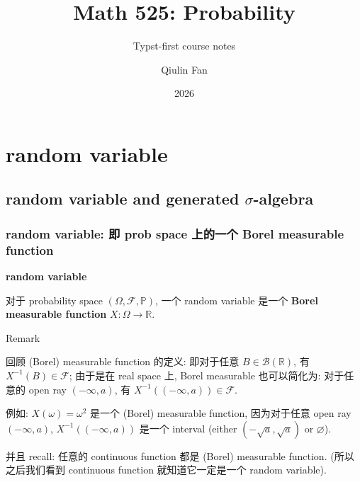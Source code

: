\documentclass{qlnotes-export}
\title{Math 525: Probability}
\subtitle{Typst-first course notes}
\author{Qiulin Fan}
\date{2026}
\begin{document}
\mainmatter
\chapter{random variable}\label{random-variable}

\section{\texorpdfstring{random variable and generated \(\sigma\)-algebra}{random variable and generated \textbackslash sigma-algebra}}\label{random-variable-and-generated-sigma-algebra}

\subsection{random variable: 即 prob space 上的一个 Borel measurable function}\label{random-variable-ux5373-prob-space-ux4e0aux7684ux4e00ux4e2a-borel-measurable-function}

\begin{definition}{\protect{}\label{kn-random-variable}{\textbf{random
variable}}}

对于 probability space \((\Omega,\mathcal{F},{\mathbb{P}})\), 一个 random variable 是一个 \textbf{Borel measurable function} \(X:\Omega\rightarrow{\mathbb{R}}\).

\end{definition}

\begin{qlremark}{Remark}

回顾 (Borel) measurable function 的定义: 即对于任意 \(B \in \mathcal{B}({\mathbb{R}})\), 有 \(X^{- 1}(B) \in \mathcal{F}\); 由于是在 real space 上, Borel measurable 也可以简化为: 对于任意的 open ray \(( - \infty,a)\), 有 \(X^{- 1}(( - \infty,a)) \in \mathcal{F}\).

例如: \(X(\omega) = \omega^{2}\) 是一个 (Borel) measurable function, 因为对于任意 open ray \(( - \infty,a)\), \(X^{- 1}(( - \infty,a))\) 是一个 interval (either \(( - \sqrt{a},\sqrt{a})\) or \(\varnothing\)).

并且 recall: 任意的 continuous function 都是 (Borel) measurable function. (所以之后我们看到 continuous function 就知道它一定是一个 random variable).

\end{qlremark}
\end{document}
